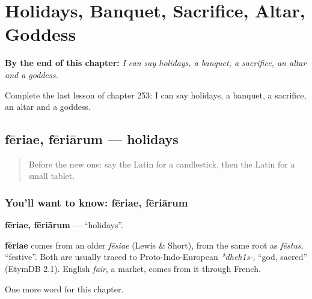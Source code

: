 
\chapter{Holidays, Banquet, Sacrifice, Altar, Goddess}
\label{ch:la-holidays-banquet-sacrifice-altar-goddess}

\begin{chapteropening}
\textbf{By the end of this chapter:} \emph{I can say holidays, a banquet, a sacrifice, an altar and a goddess.}

Complete the last lesson of chapter 253: I can say holidays, a banquet, a sacrifice, an altar and a goddess.
\end{chapteropening}

\section[fēriae, fēriārum]{fēriae, fēriārum — holidays}

\label{lesson:LA-C253-feriae}



\begin{quote}
Before the new one: say the Latin for a candlestick, then the Latin for a small tablet.
\end{quote}

\subsection*{You'll want to know: fēriae, fēriārum}
\textbf{fēriae, fēriārum} — \textquotedblleft{}holidays\textquotedblright{}.

\begin{cousinweb}
\textbf{fēriae} comes from an older \emph{fēsiae} (Lewis \& Short), from the same root as \emph{fēstus}, \textquotedblleft{}festive\textquotedblright{}. Both are usually traced to Proto-Indo-European \emph{*dheh1s-}, \textquotedblleft{}god, sacred\textquotedblright{} (EtymDB 2.1). English \emph{fair}, a market, comes from it through French.
\end{cousinweb}

\begin{grammarlens}[title={What you've built}]
One more word for this chapter.
\end{grammarlens}

